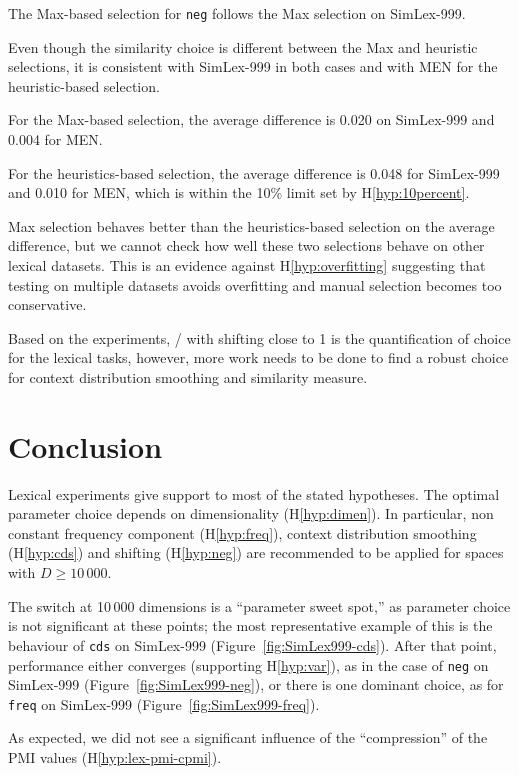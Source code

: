 The Max-based selection for \texttt{neg} follows the Max selection on SimLex-999.

Even though the similarity choice is different between the Max and heuristic selections, it is consistent with SimLex-999 in both cases and with MEN for the heuristic-based selection.

For the Max-based selection, the average difference is 0.020 on SimLex-999 and 0.004 for MEN.

For the heuristics-based selection, the average difference is 0.048 for SimLex-999 and 0.010 for MEN, which is within the 10\% limit set by H\ref{hyp:10percent}.

Max selection behaves better than the heuristics-based selection on the average difference, but we cannot check how well these two selections behave on other lexical datasets. This is an evidence against H\ref{hyp:overfitting} suggesting that testing on multiple datasets avoids overfitting and manual selection becomes too conservative.

Based on the experiments, \logNSCPMI/ with shifting close to 1 is the quantification of choice for the lexical tasks, however, more work needs to be done to find a robust choice for context distribution smoothing and similarity measure.

\section{Conclusion}
\label{sec:conclusion-lexical}

Lexical experiments give support to most of the stated hypotheses. The optimal parameter choice depends on dimensionality (H\ref{hyp:dimen}). In particular, non constant frequency component (H\ref{hyp:freq}), context distribution smoothing (H\ref{hyp:cds}) and shifting (H\ref{hyp:neg}) are recommended to be applied for spaces with $D \geq 10\,000$.

The switch at 10\,000 dimensions is a ``parameter sweet spot,'' as parameter choice is not significant at these points; the most representative example of this is the behaviour of \texttt{cds} on SimLex-999 (Figure~\ref{fig:SimLex999-cds}). After that point, performance either converges (supporting H\ref{hyp:var}), as in the case of \texttt{neg} on SimLex-999 (Figure~\ref{fig:SimLex999-neg}), or there is one dominant choice, as for \texttt{freq} on SimLex-999 (Figure~\ref{fig:SimLex999-freq}).

As expected, we did not see a significant influence of the ``compression'' of the PMI values (H\ref{hyp:lex-pmi-cpmi}).

